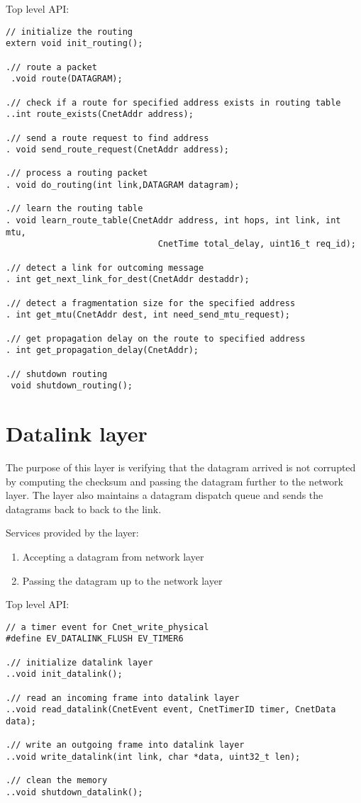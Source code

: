 \documentclass[11pt,a4paper,oneside]{report}
\begin{document}
    Top level API:  
  \begin{lstlisting}
// initialize the routing
extern void init_routing();

.// route a packet
 .void route(DATAGRAM);

.// check if a route for specified address exists in routing table
..int route_exists(CnetAddr address);

.// send a route request to find address
. void send_route_request(CnetAddr address);

.// process a routing packet
. void do_routing(int link,DATAGRAM datagram);

.// learn the routing table
. void learn_route_table(CnetAddr address, int hops, int link, int mtu,
                              CnetTime total_delay, uint16_t req_id);

.// detect a link for outcoming message
. int get_next_link_for_dest(CnetAddr destaddr);

.// detect a fragmentation size for the specified address
. int get_mtu(CnetAddr dest, int need_send_mtu_request);

.// get propagation delay on the route to specified address
. int get_propagation_delay(CnetAddr);

.// shutdown routing
 void shutdown_routing();
  \end{lstlisting}
\newpage

            
\section*{Datalink layer} 
The purpose of this layer is verifying that the datagram arrived is not
corrupted by computing the checksum and passing the datagram further to
the network layer. The layer also maintains a datagram dispatch queue 
and sends the datagrams back to back to the link.
    
    Services provided by the layer:
    \begin{enumerate}
      \item Accepting a datagram from network layer
      \item Passing the datagram up to the network layer 
    \end{enumerate}
    \newpage
    Top level API: 
  \begin{lstlisting}
// a timer event for Cnet_write_physical
#define EV_DATALINK_FLUSH EV_TIMER6

.// initialize datalink layer
..void init_datalink();

.// read an incoming frame into datalink layer
..void read_datalink(CnetEvent event, CnetTimerID timer, CnetData data);

.// write an outgoing frame into datalink layer
..void write_datalink(int link, char *data, uint32_t len);

.// clean the memory
..void shutdown_datalink();
  \end{lstlisting} 
 
\end{document}
